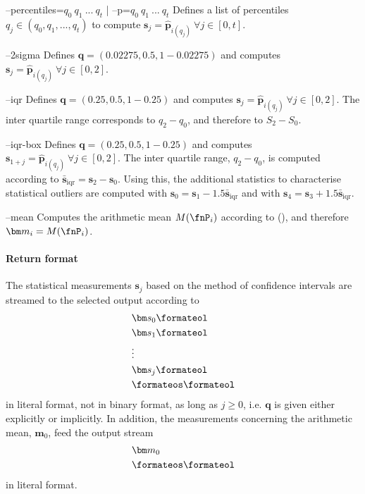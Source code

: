 
\procargout

\begin{procarg}{--percentiles=$q_0\ q_1\ ...\ q_t$ | --p=$q_0\ q_1\ ...\ q_t$}
  Defines a list of percentiles $q_j \in (q_0, q_1, ..., q_t)$ to compute $\bm s_j = \widehat{\bm p}_{i(q_j)}\ \forall j \in [0,t]$.
\end{procarg}

\begin{procarg}{--2sigma}
  Defines $\bm q = (\num{0.02275}, \num{0.5}, 1 - \num{0.02275})$ and computes $\bm s_j = \widehat{\bm p}_{i(q_j)}\ \forall j \in [0,2]$.
\end{procarg}

\begin{procarg}{--iqr}
  Defines $\bm q = (\num{0.25}, {0.5}, 1 - \num{0.25})$ and computes $\bm s_j = \widehat{\bm p}_{i(q_j)}\ \forall j \in [0,2]$. The inter quartile range corresponds to $q_2 - q_0$, and therefore to $S_2 - S_0$.
\end{procarg}

\begin{procarg}{--iqr-box}
  Defines $\bm q = (\num{0.25}, {0.5}, 1 - \num{0.25})$ and computes $\bm s_{1+j} = \widehat{\bm p}_{i(q_j)}\ \forall j \in [0,2]$. The inter quartile range, $q_2 - q_0$, is computed according to ${\bar{\bm s}}_{\text{iqr}} = \bm s_2 - \bm s_0$. Using this, the additional statistics to characterise statistical outliers are computed with $\bm s_0 = \bm s_1 - \num{1.5} {\bar{\bm s}}_{\text{iqr}}$ and with $\bm s_4 = \bm s_3 + \num{1.5} {\bar{\bm s}}_{\text{iqr}}$.
\end{procarg}

\begin{procarg}{--mean}
  Computes the arithmetic mean $M(\fnP_i)$ according to (), and therefore $\bm m_{i} = M(\fnP_i)$.
\end{procarg}

\procargsilent

\paragraph{Return format}

The statistical measurements $\bm s_j$ based on the method of confidence intervals are streamed to the selected output according to
\begin{align*}
  &\bm s_0\formateol\\
  &\bm s_1\formateol\\
  &\vdots \\
  &\bm s_j\formateol\\
  &\formateos\formateol
\end{align*}
in literal format, not in binary format, as long as $j \geq 0$, i.e. $\bm q$ is given either explicitly or implicitly. In addition, the measurements concerning the  arithmetic mean, $\bm m_0$, feed the output stream
\begin{align*}
  &\bm m_0\\
  &\formateos\formateol
\end{align*}
in literal format.

